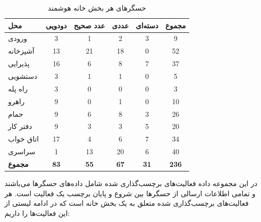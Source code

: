 \begin{table} [htp]
 \centering
 \caption{حسگرهای هر بخش خانه هوشمند}
 \label{tab:tO4H1}
 \begin{adjustbox}{width=0.8\textwidth}
\begin{tabular}{|l|c|c|c|c|c|}
\hline
\textbf{محل} & \textbf{دودویی} & \textbf{عدد صحیح} & \textbf{عددی} & \textbf{دسته‌ای} & \textbf{مجموع} \\ \hline
ورودی       & 3               & 1                & 2                    & 3                    & 9             \\ \hline
آشپزخانه        & 13              & 21               & 18                   & 0                    & 52            \\ \hline
پذیرایی    & 16              & 6                & 8                    & 7                    & 37            \\ \hline
دستشویی         & 3               & 1                & 1                    & 0                    & 5             \\ \hline
راه پله      & 3               & 0                & 0                    & 0                    & 3             \\ \hline
راهرو        & 9               & 0                & 1                    & 0                    & 10            \\ \hline
حمام       & 9               & 6                & 8                    & 3                    & 26            \\ \hline
دفتر کار         & 9               & 3                & 3                    & 5                    & 20            \\ \hline
اتاق خواب        & 17              & 4                & 6                    & 7                    & 34            \\ \hline
سراسری         & 1               & 13               & 20                   & 6                    & 40            \\ \hline
\textbf{مجموع} & \textbf{83}     & \textbf{55}      & \textbf{67}          & \textbf{31}          & \textbf{236}  \\ \hline
\end{tabular}
\end{adjustbox}
\end{table}

در این مجموعه داده فعالیت‌های برچسب‌گذاری شده شامل داده‌های حسگرها می‌باشند و تمامی اطلاعات ارسالی از حسگرها بین شروع و پایان برچسب یک فعالیت است. هر فعالیت‌های برچسب‌گذاری شده متعلق به یک بخش خانه است که در ادامه لیستی از این فعالیت‌ها را داریم:

